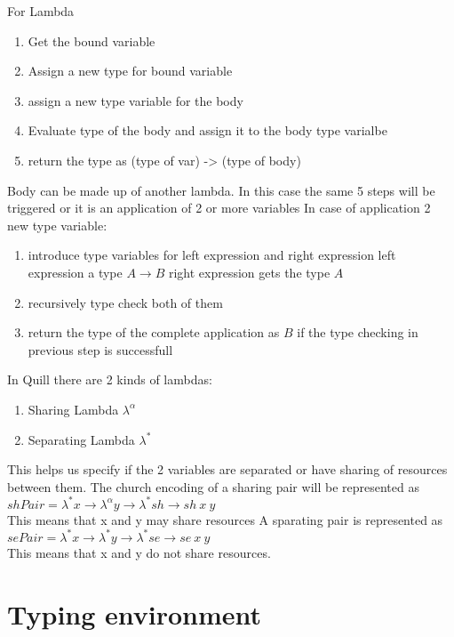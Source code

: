 For Lambda
\begin{enumerate}
\item Get the bound variable
\item Assign a new type for bound variable
\item assign a new type variable for the body
\item Evaluate type of the body and assign it to the body type varialbe
\item return the type as (type of var) -> (type of body)
\end{enumerate}

Body can be made up of another lambda. In this case the same 5 steps will be triggered
or it is an application of 2 or more variables
In case of application 2 new type variable:
\begin{enumerate}
\item introduce type variables for left expression and right expression
    left expression a type $A \rightarrow B$ right expression gets the type $A$
\item recursively type check both of them
\item return the type of the complete application as $B$ if the type checking in previous step is successfull
\end{enumerate}


In Quill there are 2 kinds of lambdas:
\begin{enumerate}
\item Sharing Lambda $\lambda^{\alpha}$
\item Separating Lambda $\lambda^{*}$
\end{enumerate}
This helps us specify if the 2 variables are separated or have sharing
of resources between them.
The church encoding of a sharing pair will be represented as\\
$shPair = \lambda^{*} x \rightarrow \lambda^{\alpha} y \rightarrow \lambda^{*} sh \rightarrow sh\ x\ y$\\
This means that x and y may share resources
A sparating pair is represented as\\
$sePair = \lambda^{*} x \rightarrow \lambda^{*}y \rightarrow \lambda^{*}se \rightarrow se\ x\ y$\\
This means that x and y do not share resources.

\section{Typing environment}

